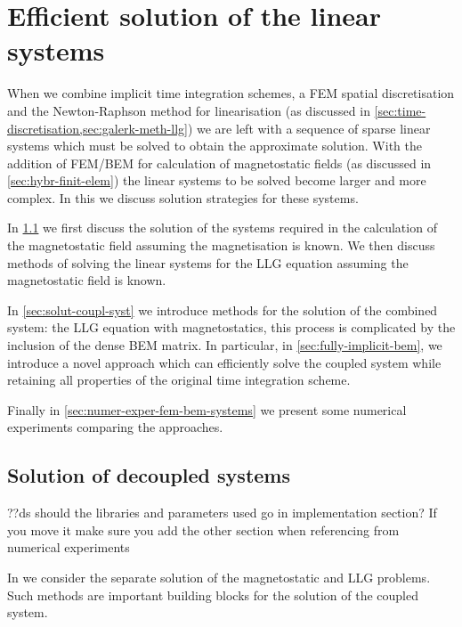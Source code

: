 \chapter{Efficient solution of the linear systems}
\label{sec:solution-strategies}

\newcommand{\Nn}{N} %
\newcommand{\Nb}{N_b} %
\newcommand{\Nj}{N_j} %

When we combine implicit time integration schemes, a FEM spatial discretisation and the Newton-Raphson method for linearisation (as discussed in \cref{sec:time-discretisation,sec:galerk-meth-llg}) we are left with a sequence of sparse linear systems which must be solved to obtain the approximate solution.
With the addition of FEM/BEM for calculation of magnetostatic fields (as discussed in \cref{sec:hybr-finit-elem}) the linear systems to be solved become larger and more complex.
In this  we discuss solution strategies for these systems.

In \cref{sec:llg-only-system} we first discuss the solution of the systems required in the calculation of the magnetostatic field assuming the magnetisation is known.
We then discuss methods of solving the linear systems for the LLG equation assuming the magnetostatic field is known.

In \cref{sec:solut-coupl-syst} we introduce methods for the solution of the combined system: the LLG equation with magnetostatics, this process is complicated by the inclusion of the dense BEM matrix.
In particular, in \cref{sec:fully-implicit-bem}, we introduce a novel approach which can efficiently solve the coupled system while retaining all properties of the original time integration scheme.

Finally in \cref{sec:numer-exper-fem-bem-systems} we present some numerical experiments comparing the approaches.


\section{Solution of decoupled systems}
\label{sec:llg-only-system}

??ds should the libraries and parameters used go in implementation section? If you move it make sure you add the other section when referencing from numerical experiments

In  we consider the separate solution of the magnetostatic and LLG problems.
Such methods are important building blocks for the solution of the coupled system.

